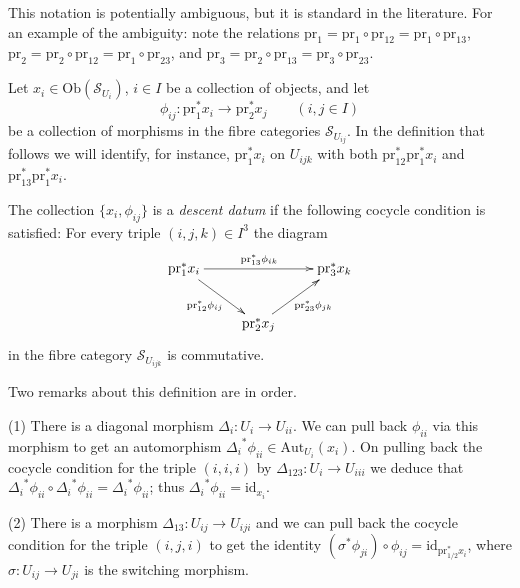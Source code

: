\medskip\noindent
This notation is potentially ambiguous, but it is standard in the
literature. For an example of the ambiguity: note the relations
$\text{pr}_1 = \text{pr}_{1} \circ \text{pr}_{12} =
\text{pr}_1 \circ \text{pr}_{13}$, $\text{pr}_2 =
\text{pr}_2 \circ \text{pr}_{12} = \text{pr}_1 \circ \text{pr}_{23}$,
and $\text{pr}_3 = \text{pr}_2 \circ \text{pr}_{13} =
\text{pr}_3 \circ \text{pr}_{23}$.

\medskip\noindent
Let $x_i \in \text{Ob}(\mathcal{S}_{U_i})$, $i\in I$ be a collection of
objects, and let
$$
\phi_{ij} : \text{pr}_{1}^\ast x_i \longrightarrow
\text{pr}_{2}^\ast x_j \qquad (i, j \in I)
$$
be a collection of morphisms in the fibre categories
$\mathcal{S}_{U_{ij}}$. In the definition that follows we will
identify, for instance, $\text{pr}_1^\ast x_i$ on $U_{ijk}$ with both
$\text{pr}_{12}^\ast \text{pr}_{1}^\ast x_i$ and
$\text{pr}_{13}^\ast \text{pr}_{1}^\ast x_i$.

\begin{definition}
\label{definition-descent-data}
The collection $\{x_i, \phi_{ij}\}$ is a {\it descent datum} if
the following cocycle condition is satisfied: For every
triple $(i, j, k)\in I^3$ the diagram
$$
\xymatrix{
\text{pr}_1^\ast x_i
	\ar[rr]^{\text{pr}_{13}^\ast \phi_{ik}}
	\ar[rd]_{\text{pr}_{12}^\ast \phi_{ij}}
& &
\text{pr}_3^\ast x_k \\
& \text{pr}_2^\ast x_j \ar[ru]_{\text{pr}_{23}^\ast \phi_{jk}}
}
$$
in the fibre category $\mathcal{S}_{U_{ijk}}$ is commutative.
\end{definition}

\begin{remarks}
\label{remarks-definition-descent-datum}
Two remarks about this definition are in order.

\medskip\noindent
(1) There is a diagonal morphism $\Delta_i : U_i \to U_{ii}$. We can pull back
$\phi_{ii}$ via this morphism to get an automorphism
${\Delta_i}^\ast \phi_{ii} \in \text{Aut}_{U_i}(x_i)$.
On pulling back the cocycle condition for the triple $(i, i, i)$
by $\Delta_{123} : U_i \to U_{iii}$ we deduce that
${\Delta_i}^\ast \phi_{ii} \circ {\Delta_i}^\ast \phi_{ii} =
{\Delta_i}^\ast \phi_{ii}$; thus ${\Delta_i}^\ast \phi_{ii} =
\text{id}_{x_i}$.

\medskip\noindent
(2) There is a morphism
$\Delta_{13}: U_{ij} \to U_{iji}$ and we can pull back the
cocycle condition for the triple $(i, j, i)$ to get the
identity $(\sigma^\ast \phi_{ji}) \circ \phi_{ij} =
\text{id}_{\text{pr}_{1/2}^\ast x_i}$, where $\sigma: U_{ij} \to U_{ji}$ is the
switching morphism.
\end{remarks}

